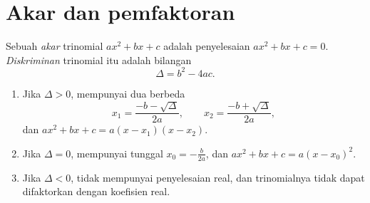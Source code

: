 \section{Akar dan pemfaktoran}

\begin{definition}\label{def:g11:quad:discriminant}
Sebuah \emph{akar} trinomial $ax^2+bx+c$ adalah penyelesaian
 $ax^2 + bx + c = 0$. \emph{Diskriminan}
trinomial itu adalah bilangan
\[
\Delta = b^2 - 4ac .
\]
\end{definition}

\begin{theorem}[Menyelesaikan $ax^2+bx+c=0$]\label{thm:g11:quad:roots}
\begin{enumerate}
  \item Jika $\Delta > 0$,  mempunyai dua  berbeda
        \[
        x_1 = \frac{-b - \sqrt{\Delta}}{2a},
        \qquad
        x_2 = \frac{-b + \sqrt{\Delta}}{2a},
        \]
        dan $ax^2+bx+c = a(x - x_1)(x - x_2)$.
  \item Jika $\Delta = 0$,  mempunyai  tunggal
        $x_0 = -\frac{b}{2a}$, dan $ax^2+bx+c = a(x - x_0)^2$.
  \item Jika $\Delta < 0$,  tidak mempunyai penyelesaian real, dan
        trinomialnya tidak dapat difaktorkan dengan koefisien real.
\end{enumerate}
\end{theorem}

